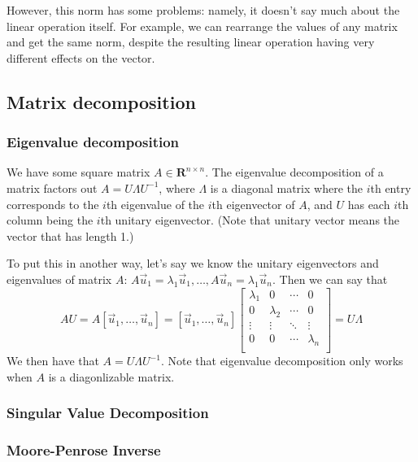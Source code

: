 \documentclass[answers,12pt]{exam}
\begin{document}
However, this norm has some problems: namely, it doesn't say much about the linear operation itself.
For example, we can rearrange the values of any matrix and get the same norm, despite the resulting linear operation having very different effects on the vector.


\subsection{Matrix decomposition}

\subsubsection{Eigenvalue decomposition}
We have some square matrix $A \in \mathbf{R}^{n \times n}$.
The eigenvalue decomposition of a matrix factors out $A = U \Lambda U^{-1}$, where $\Lambda$ is a diagonal matrix where the $i$th entry corresponds to the $i$th eigenvalue of the $i$th eigenvector of $A$, and $U$ has each $i$th column being the $i$th unitary eigenvector.
(Note that unitary vector means the vector that has length 1.)

To put this in another way, let's say we know the unitary eigenvectors and eigenvalues of matrix $A$: $A \vec{u}_1 = \lambda_1 \vec{u}_1, \dots, A \vec{u}_n = \lambda_1 \vec{u}_n$.
Then we can say that 
\[
    AU = A [\vec{u}_1, \dots, \vec{u}_n] = [\vec{u}_1, \dots, \vec{u}_n]
    \begin{bmatrix}
        \lambda_1 & 0 & \cdots & 0 \\
        0 & \lambda_2 & \cdots & 0 \\
        \vdots & \vdots & \ddots & \vdots \\
        0 & 0 & \cdots & \lambda_n \\
    \end{bmatrix}
    = U \Lambda
\]
We then have that $A = U \Lambda U^{-1}$.
Note that eigenvalue decomposition only works when $A$ is a diagonlizable matrix.

\subsubsection{Singular Value Decomposition}

\subsubsection{Moore-Penrose Inverse}
\end{document}

